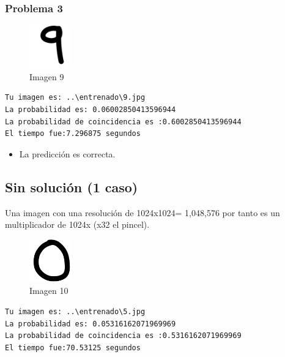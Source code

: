 \documentclass[
  spanish,
]{article}
\providecommand{\tightlist}{%
  \setlength{\itemsep}{0pt}\setlength{\parskip}{0pt}}
\begin{document}
\hypertarget{problema-3-2}{%
\subsubsection{Problema 3}\label{problema-3-2}}

\begin{figure}
\centering
\includegraphics[width=0.72917in,height=\textheight]{documentacion/img/9.png}
\caption{Imagen 9}
\end{figure}

\begin{verbatim}
Tu imagen es: ..\entrenado\9.jpg
La probabilidad es: 0.06002850413596944
La probabilidad de coincidencia es :0.6002850413596944
El tiempo fue:7.296875 segundos
\end{verbatim}

\begin{itemize}
\tightlist
\item
  La predicción es correcta.
\end{itemize}

\hypertarget{sin-soluciuxf3n-1-caso}{%
\subsection{Sin solución (1 caso)}\label{sin-soluciuxf3n-1-caso}}

Una imagen con una resolución de 1024x1024= 1,048,576 por tanto es un
multiplicador de 1024x (x32 el pincel).

\begin{figure}
\centering
\includegraphics[width=0.72917in,height=\textheight]{documentacion/img/0.png}
\caption{Imagen 10}
\end{figure}

\begin{verbatim}
Tu imagen es: ..\entrenado\5.jpg
La probabilidad es: 0.05316162071969969
La probabilidad de coincidencia es :0.5316162071969969
El tiempo fue:70.53125 segundos
\end{verbatim}
\end{document}
